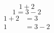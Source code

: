 \documentclass{article}
\begin{document}
	\begin{equation*}
		1+2
	\end{equation*}
\begin{equation*}
    	1=3-2
    \end{equation*}
    \begin{align*}
    	1+2 &=3\\
    	1 &= 3-2  	
     \end{align*}
\end{document}
